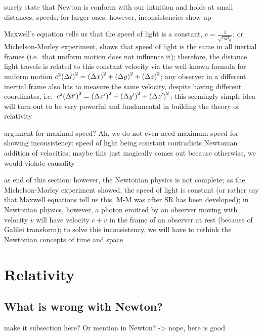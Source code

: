 surely state that Newton is conform with our intuition and holds at small distances, speeds; for larger ones, however, inconsistencies show up



Maxwell's equation tells us that the speed of light is a constant, $c = \frac{1}{\sqrt{\epsilon_0 \mu_0}}$; or Michelson-Morley experiment, shows that speed of light is the same in all inertial frames (i.e.~that uniform motion does not influence it); therefore, the distance light travels is related to this constant velocity via the well-known formula for uniform motion $c^2 \qty(\Delta t)^2 = \qty(\Delta x)^2 + \qty(\Delta y)^2 + \qty(\Delta z)^2$; any observer in a different inertial frame also has to measure the same velocity, despite having different coordinates, i.e.~$c^2 \qty(\Delta t')^2 = \qty(\Delta x')^2 + \qty(\Delta y')^2 + \qty(\Delta z')^2$; this seemingly simple idea will turn out to be very powerful and fundamental in building the theory of relativity

argument for maximal speed? Ah, we do not even need maximum speed for showing inconsistency: speed of light being constant contradicts Newtonian addition of velocities; maybe this just magically comes out because otherwise, we would violate causality



as end of this section: however, the Newtonian physics is not complete; as the Michelson-Morley experiment showed, the speed of light is constant (or rather say that Maxwell equations tell us this, M-M was after SR has been developed); in Newtonian physics, however, a photon emitted by an observer moving with velocity $v$ will have velocity $c + v$ in the frame of an observer at rest (because of Galilei transform); to solve this inconsistency, we will have to rethink the Newtonian concepts of time and space



\newpage



	\section{Relativity}
		\subsection{What is wrong with Newton?}
make it subsection here? Or mention in Newton? -> nope, here is good



